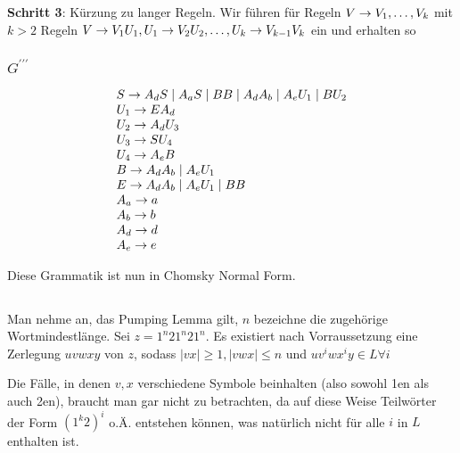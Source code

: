\documentclass{article}
\begin{document}
\textbf{Schritt 3}: K\"urzung zu langer Regeln. Wir f\"uhren f\"ur Regeln $V \rightarrow
V_1,\ldots,V_k$ mit $k > 2$ Regeln $V \rightarrow V_1U_1, U_1 \rightarrow V_2U_2,\ldots,U_k \rightarrow
V_{k-1}V_k$ ein und erhalten so

\subsubsection{$G^{\prime\prime\prime}$}

\begin{align*}
\begin{array}{l}
   S \rightarrow A_dS \mid A_aS \mid BB \mid A_dA_b \mid A_eU_1 \mid BU_2 \\
   U_1 \rightarrow EA_d \\
   U_2 \rightarrow A_dU_3 \\
   U_3 \rightarrow SU_4 \\
   U_4 \rightarrow A_eB \\
   B \rightarrow A_dA_b \mid A_eU_1 \\
   E \rightarrow A_dA_b \mid A_eU_1 \mid BB \\
   A_a \rightarrow a  \\
   A_b \rightarrow b \\
   A_d \rightarrow d \\
   A_e \rightarrow e
\end{array}
\end{align*}

Diese Grammatik ist nun in Chomsky Normal Form.

\subsection{} 

Man nehme an, das Pumping Lemma gilt, $n$ bezeichne die zugehörige
Wortmindestlänge. Sei $z = 1^n21^n21^n$. Es existiert nach Vorraussetzung eine
Zerlegung $uvwxy$ von $z$, sodass $|vx|\ge1,|vwx|\le n$ und $uv^iwx^iy \in L \forall i$

Die Fälle, in denen $v,x$ verschiedene Symbole beinhalten (also sowohl 1en als
auch 2en), braucht man gar nicht zu betrachten, da auf diese Weise Teilwörter der
Form $(1^k2)^i$ o.Ä. entstehen können, was natürlich nicht für alle $i$ in $L$
enthalten ist.
\end{document}
